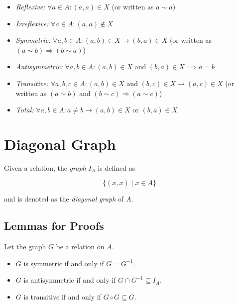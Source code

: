 \begin{itemize}

	\item \emph{Reflexive:} \(\forall a \in A: (a, a) \in X\) (or written as \(a \sim a\))

	\item \emph{Irreflexive:} \(\forall a \in A: (a, a) \not\in X\)

	\item \emph{Symmetric:} \(\forall a, b \in A: (a, b) \in X \to (b, a) \in X\) (or written as 
		  \((a \sim b) \Rightarrow (b \sim a)\))

	\item \emph{Antisymmetric:} \(\forall a, b \in A: (a, b) \in X \text{ and } (b, a) \in X \implies a = b\)

	\item \emph{Transitive:} \(\forall a, b, c \in A: (a, b) \in X \text{ and } (b, c) \in X \to (a, c) 
		  \in X\) (or written as \((a \sim b) \text{ and } (b \sim c) \Rightarrow (a \sim c)\))

	\item \emph{Total:} \(\forall a,b \in A: a \neq b \to (a, b) \in X \text{ or } (b, a) \in X\)

\end{itemize}

\section{Diagonal Graph}

Given a relation, the \emph{graph} \(I_A\) is defined as 

\[
	\{(x, x) \mid x \in A\}
\] 

and is denoted as the \emph{diagonal graph} of \(A\).

\subsection{Lemmas for Proofs}

Let the graph \(G\) be a relation on \(A\).

\begin{itemize}
	
	\item \(G\) is symmetric if and only if \(G = G^{-1}\).

	\item \(G\) is antisymmetric if and only if \(G \cap G^{-1} \subseteq I_A\).

	\item \(G\) is transitive if and only if \(G \circ G \subseteq G\).

\end{itemize}

